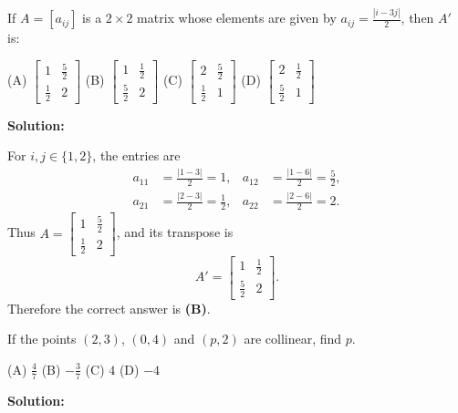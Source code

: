 \documentclass[journal]{IEEEtran}
\begin{document}
\begin{list}{}{\setlength{\leftmargin}{1.15cm}\setlength{\labelwidth}{1.0cm}\setlength{\labelsep}{0.15cm}\setlength{\itemindent}{0pt}\setlength{\listparindent}{0pt}\setlength{\itemsep}{\baselineskip}\setlength{\parsep}{0pt}\setlength{\topsep}{0pt}}
\item[4.1.2] If $A=[a_{ij}]$ is a $2\times2$ matrix whose elements are given by $a_{ij}=\frac{|i-3j|}{2}$, then $A'$ is:

\noindent (A) $\begin{bmatrix}1&\frac{5}{2}\\[2pt]\frac{1}{2}&2\end{bmatrix}$ \hfill
(B) $\begin{bmatrix}1&\frac{1}{2}\\[2pt]\frac{5}{2}&2\end{bmatrix}$ \hfill
(C) $\begin{bmatrix}2&\frac{5}{2}\\[2pt]\frac{1}{2}&1\end{bmatrix}$ \hfill
(D) $\begin{bmatrix}2&\frac{1}{2}\\[2pt]\frac{5}{2}&1\end{bmatrix}$

\vspace{0.6em}\par\noindent\textbf{Solution:}

For $i,j\in\{1,2\}$, the entries are
\[
\begin{aligned}
a_{11}&=\frac{|1-3|}{2}=1, & a_{12}&=\frac{|1-6|}{2}=\frac52,\\
a_{21}&=\frac{|2-3|}{2}=\frac12, & a_{22}&=\frac{|2-6|}{2}=2.
\end{aligned}
\]
Thus $A=\begin{bmatrix}1&\frac52\\[2pt]\frac12&2\end{bmatrix}$, and its transpose is
\[
A'=\begin{bmatrix}1&\frac12\\[2pt]\frac52&2\end{bmatrix}.
\]
Therefore the correct answer is \textbf{(B)}.

\item[4.1.4] If the points $(2,3)$, $(0,4)$ and $(p,2)$ are collinear, find $p$.

\noindent (A) $\frac47$ \hfill (B) $-\frac37$ \hfill (C) $4$ \hfill (D) $-4$

\vspace{0.6em}\par\noindent\textbf{Solution:}


\end{list}
\end{document}
